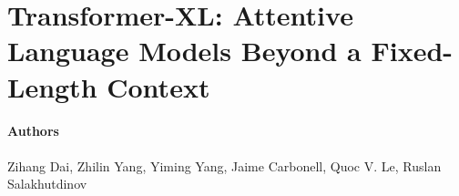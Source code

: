 \section{Transformer-XL: Attentive Language Models Beyond a Fixed-Length Context}
\paragraph{Authors} Zihang Dai, Zhilin Yang, Yiming Yang, Jaime Carbonell, Quoc V. Le, Ruslan Salakhutdinov %

